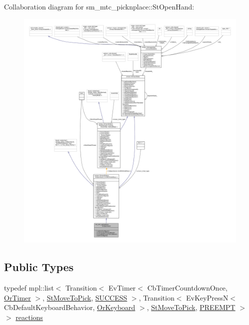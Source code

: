 Collaboration diagram for sm\+\_\+mtc\+\_\+picknplace\+:\+:St\+Open\+Hand\+:
\nopagebreak
\begin{figure}[H]
\begin{center}
\leavevmode
\includegraphics[width=350pt]{structsm__mtc__picknplace_1_1StOpenHand__coll__graph}
\end{center}
\end{figure}
\subsection*{Public Types}
\begin{DoxyCompactItemize}
\item 
typedef mpl\+::list$<$ Transition$<$ Ev\+Timer$<$ Cb\+Timer\+Countdown\+Once, \hyperlink{classsm__mtc__picknplace_1_1OrTimer}{Or\+Timer} $>$, \hyperlink{structsm__mtc__picknplace_1_1StMoveToPick}{St\+Move\+To\+Pick}, \hyperlink{classSUCCESS}{S\+U\+C\+C\+E\+SS} $>$, Transition$<$ Ev\+Key\+PressN$<$ Cb\+Default\+Keyboard\+Behavior, \hyperlink{classsm__mtc__picknplace_1_1OrKeyboard}{Or\+Keyboard} $>$, \hyperlink{structsm__mtc__picknplace_1_1StMoveToPick}{St\+Move\+To\+Pick}, \hyperlink{classPREEMPT}{P\+R\+E\+E\+M\+PT} $>$ $>$ \hyperlink{structsm__mtc__picknplace_1_1StOpenHand_a8dc2ce7560eb60846fa7447a30f222ba}{reactions}
\end{DoxyCompactItemize}

